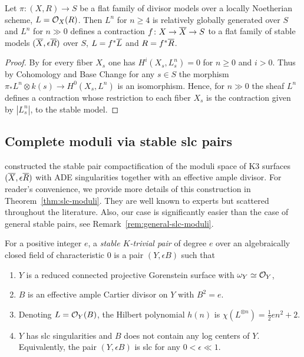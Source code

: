 \documentclass[table,x11names]{amsart}
\begin{document}
\begin{lemma}\label{lem:div-to-slc-families} 
  Let $\pi\colon (X,R)\to S$ be a flat family of divisor models over a
  locally Noetherian scheme, $L={\mathcal O}_X(R)$. Then $L^n$ for $n\ge4$ is
  relatively globally generated over $S$ and $L^n$ for $n\gg0$ defines
  a contraction $f\colon X\to {\overline X}\to S$ to a flat family of stable
  models $({\overline X}, \epsilon {\overline R})$ over $S$, $L=f^*{\overline L}$ and $R=f^*{\overline R}$.
\end{lemma}
\begin{proof}
  By \cite[Lemma 2.17]{shepherd-barron1981extending-polarizations} for
  every fiber $X_s$ one has $H^i(X_s, L_s^n)=0$ for $n\ge0$ and
  $i>0$. 
  Thus by Cohomology
  and Base Change \cite[III.12.11]{hartshorne1977algebraic-geometry}
  for any $s\in S$ the morphism $\pi_*L^n \otimes k(s) \to
  H^0(X_s,L^n)$ is an isomorphism. Hence, for $n\gg0$ the sheaf $L^n$
  defines a contraction whose restriction to each fiber $X_s$ is the
  contraction given by $|L_s^n|$, to the stable model.
\end{proof}


\subsection{Complete moduli via stable slc pairs}
\label{sec:complete-moduli}

\cite{alexeev2019stable-pair} constructed the stable pair
compactification of the moduli space of K3 surfaces $({\overline X}, \epsilon
{\overline R})$ with ADE singularities together 
with an effective ample divisor.  For reader's convenience, we provide
more details of this construction in Theorem~\ref{thm:slc-moduli}. They
are well known to experts but scattered throughout the literature.
Also, our case is significantly easier than the case of general stable
pairs, see Remark~\ref{rem:general-slc-moduli}.

\begin{definition}
  For a positive integer $e$, 
  a \emph{stable $K$-trivial pair} of degree $e$ over an algebraically
  closed field of characteristic $0$ is 
  a pair $(Y,\epsilon B)$ such that
  \begin{enumerate}
  \item $Y$ is a reduced connected projective Gorenstein surface with
    $\omega_Y\simeq{\mathcal O}_Y$,
  \item $B$ is an effective ample Cartier divisor on $Y$ with $B^2=e$.
  \item Denoting $L={\mathcal O}_Y(B)$, 
the Hilbert polynomial $h(n)$ is $\chi(L^{\otimes n})= \frac12 en^2 + 2$.
  \item $Y$ has slc singularities and $B$ does
    not contain any log centers of $Y$. Equivalently, 
    the pair $(Y,\epsilon B)$ is slc for any $0<\epsilon\ll1$.
  \end{enumerate}
\end{definition}
\end{document}
